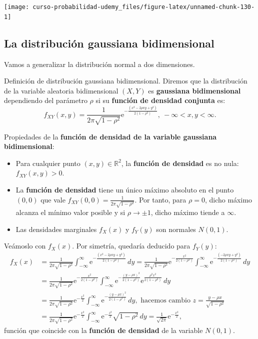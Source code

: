 \documentclass[]{book}
\begin{document}
\begin{center}\texttt{[image: curso-probabilidad-udemy\_files/figure-latex/unnamed-chunk-130-1]} \end{center}

\hypertarget{la-distribuciuxf3n-gaussiana-bidimensional}{%
\subsection{La distribución gaussiana bidimensional}\label{la-distribuciuxf3n-gaussiana-bidimensional}}

Vamos a generalizar la distribución normal a dos dimensiones.

Definición de distribución gaussiana bidimensional.
Diremos que la distribución de la variable aleatoria bidimensional \((X,Y)\) es \textbf{gaussiana bidimensional} dependiendo del parámetro \(\rho\) si su \textbf{función de densidad conjunta} es:
\[
f_{XY}(x,y)=\frac{1}{2\pi\sqrt{1-\rho^2}}\mathrm{e}^{-\frac{(x^2-2\rho xy+y^2)}{2(1-\rho^2)}},\ -\infty <x,y<\infty.
\]

Propiedades de la \textbf{función de densidad de la variable gaussiana bidimensional}:

\begin{itemize}
\item
  Para cualquier punto \((x,y)\in\mathbb{R}^2\), la \textbf{función de densidad} es no nula: \(f_{XY}(x,y)>0\).
\item
  La \textbf{función de densidad} tiene un único máximo absoluto en el punto \((0,0)\) que vale \(f_{XY}(0,0)=\frac{1}{2\pi\sqrt{1-\rho^2}}.\) Por tanto, para \(\rho=0\), dicho máximo alcanza el mínimo valor posible y si \(\rho\to \pm 1\), dicho máximo tiende a \(\infty\).
\item
  Las densidades marginales \(f_X(x)\) y \(f_Y(y)\) son normales \(N(0,1)\).
\end{itemize}

Veámoslo con \(f_X(x)\). Por simetría, quedaría deducido para \(f_Y(y)\):
\[
\begin{array}{rl}
f_X(x) & =\frac{1}{2\pi\sqrt{1-\rho^2}}\int_{-\infty}^\infty \mathrm{e}^{-\frac{(x^2-2\rho xy+y^2)}{2(1-\rho^2)}}\, dy =
\frac{1}{2\pi\sqrt{1-\rho^2}}\mathrm{e}^{-\frac{x^2}{2(1-\rho^2)}}\int_{-\infty}^\infty \mathrm{e}^{-\frac{(-2\rho xy+y^2)}{2(1-\rho^2)}}\, dy \\ & = \frac{1}{2\pi\sqrt{1-\rho^2}}\mathrm{e}^{-\frac{x^2}{2(1-\rho^2)}} \int_{-\infty}^\infty \mathrm{e}^{-\frac{(y-\rho x)^2}{2(1-\rho^2)}} \mathrm{e}^{\frac{\rho^2 x^2}{2(1-\rho^2)}}\, dy \\ & =\frac{1}{2\pi\sqrt{1-\rho^2}}\mathrm{e}^{-\frac{x^2}{2}} \int_{-\infty}^\infty \mathrm{e}^{-\frac{(y-\rho x)^2}{2(1-\rho^2)}}\, dy,  \mbox{ hacemos cambio $z=\frac{y-\rho x}{\sqrt{1-\rho^2}}$}\\ & = \frac{1}{2\pi\sqrt{1-\rho^2}}\mathrm{e}^{-\frac{x^2}{2}} \int_{-\infty}^\infty \mathrm{e}^{-\frac{z^2}{2}}\sqrt{1-\rho^2}\, dy =\frac{1}{\sqrt{2\pi}}\mathrm{e}^{-\frac{x^2}{2}},
\end{array}
\]
función que coincide con la \textbf{función de densidad} de la variable \(N(0,1)\).
\end{document}
